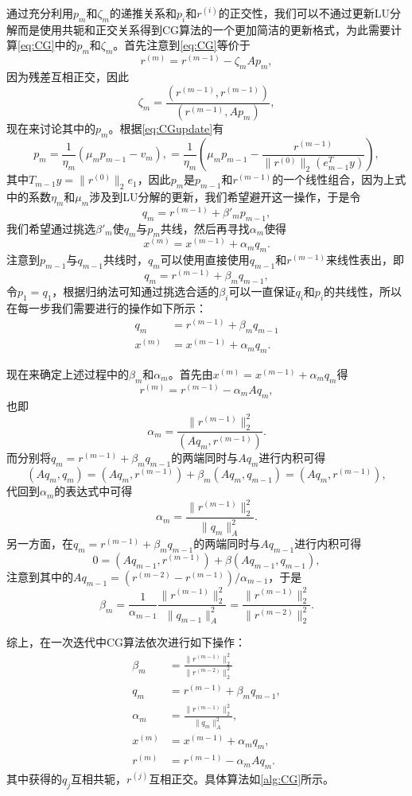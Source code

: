 \documentclass[a4paper,10pt]{ctexart}
\begin{document}
通过充分利用$ p_m $和$ \zeta_m $的递推关系和$ p_i $和$ r^{(i)} $的正交性，我们可以不通过更新LU分解而是使用共轭和正交关系得到CG算法的一个更加简洁的更新格式，为此需要计算\eqref{eq:CG}中的$ p_m $和$ \zeta_m $。首先注意到\eqref{eq:CG}等价于
\[
    r^{(m)} = r^{(m-1)} - \zeta_m A p_m,
\]
因为残差互相正交，因此
\[
    \zeta_m = \frac{(r^{(m-1)}, r^{(m-1)})}{(r^{(m-1)}, A p_m)},
\]
现在来讨论其中的$ p_m $。根据\eqref{eq:CGupdate}有
\[
    p_m = \frac{1}{\eta_m}(\mu_m p_{m-1} - v_m), = \frac{1}{\eta_m}(\mu_m p_{m-1} - \frac{r^{(m-1)}}{\| r^{(0)} \|_2(e_{m-1}^Ty)}),
\]
其中$ T_{m-1}y = \| r^{(0)} \|_2 e_1 $，因此$ p_m $是$ p_{m-1} $和$ r^{(m-1)} $的一个线性组合，因为上式中的系数$ \eta_m $和$ \mu_m $涉及到LU分解的更新，我们希望避开这一操作，于是令
\[
    q_m = r^{(m-1)} + \beta'_m p_{m-1},
\]
我们希望通过挑选$ \beta'_m $使$ q_m $与$ p_m $共线，然后再寻找$ \alpha_m $使得
\[
    x^{(m)} = x^{(m-1)} + \alpha_m q_{m}.
\]
注意到$ p_{m-1} $与$ q_{m-1} $共线时，$ q_m $可以使用直接使用$ q_{m-1} $和$ r^{(m-1)} $来线性表出，即
\[
    q_m = r^{(m-1)} + \beta_m q_{m-1},
\]
令$ p_1 = q_1 $，根据归纳法可知通过挑选合适的$ \beta_i $可以一直保证$ q_i $和$ p_i $的共线性，所以在每一步我们需要进行的操作如下所示：
\begin{equation}
    \begin{aligned}
        q_m &= r^{(m-1)} + \beta_m q_{m-1}\\
        x^{(m)} &= x^{(m-1)} + \alpha_m q_{m}.
    \end{aligned}
\end{equation}

现在来确定上述过程中的$ \beta_m $和$ \alpha_m $。首先由$ x^{(m)} = x^{(m-1)} + \alpha_m q_{m} $得
\[
    r^{(m)} = r^{(m-1)} - \alpha_m A q_m,
\]
也即
\[
    \alpha_m = \frac{\| r^{(m-1)} \|_2^2}{(Aq_m,r^{(m-1)})}.
\]
而分别将$ q_m = r^{(m-1)} + \beta_m q_{m-1} $的两端同时与$ Aq_m $进行内积可得
\[
    (Aq_m,q_m) = (Aq_m,r^{(m-1)}) + \beta_m(Aq_m,q_{m-1}) = (Aq_m,r^{(m-1)}),
\]
代回到$ \alpha_m $的表达式中可得
\[
    \alpha_m = \frac{\| r^{(m-1)} \|_2^2}{\| q_m \|_A^2}.
\]
另一方面，在$ q_m = r^{(m-1)} + \beta_m q_{m-1} $的两端同时与$ Aq_{m-1} $进行内积可得
\[
    0 = (Aq_{m-1}, r^{(m-1)}) + \beta(Aq_{m-1},q_{m-1}),
\]
注意到其中的$ Aq_{m-1} = (r^{(m-2)}-r^{(m-1)}) / \alpha_{m-1} $，于是
\[
    \beta_m = \frac{1}{\alpha_{m-1}} \frac{\| r^{(m-1)} \|_2^2}{\| q_{m-1} \|_A^2} = \frac{\| r^{(m-1)} \|_2^2}{\| r^{(m-2)} \|_2^2}.
\]

综上，在一次迭代中CG算法依次进行如下操作：
\begin{equation}
    \begin{aligned}
        \beta_m &= \frac{\| r^{(m-1)} \|_2^2}{\| r^{(m-2)} \|_2^2}\\
        q_m &= r^{(m-1)} + \beta_m q_{m-1},\\
        \alpha_m &= \frac{\| r^{(m-1)} \|_2^2}{\| q_m \|_A^2},\\
        x^{(m)} &= x^{(m-1)} + \alpha_m q_{m},\\
        r^{(m)} &= r^{(m-1)} - \alpha_m A q_m.
    \end{aligned}
\end{equation}
其中获得的$ q_j $互相共轭，$ r^{(j)} $互相正交。具体算法如\ref{alg:CG}所示。
\end{document}
